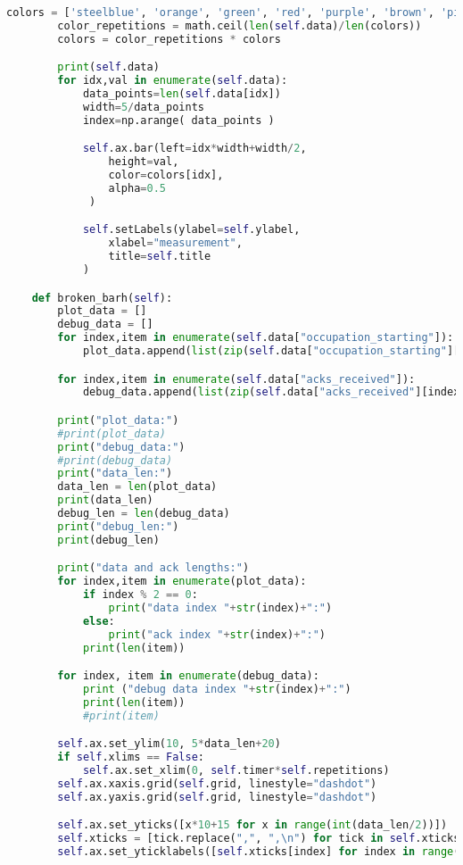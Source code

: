 \begin{lstlisting}[language=Python,caption=myplot.py]
        colors = ['steelblue', 'orange', 'green', 'red', 'purple', 'brown', 'pink']
        color_repetitions = math.ceil(len(self.data)/len(colors))
        colors = color_repetitions * colors

        print(self.data)
        for idx,val in enumerate(self.data):
            data_points=len(self.data[idx])
            width=5/data_points
            index=np.arange( data_points )

            self.ax.bar(left=idx*width+width/2,
                height=val,
                color=colors[idx],
                alpha=0.5
             )

            self.setLabels(ylabel=self.ylabel,
                xlabel="measurement",
                title=self.title
            )

    def broken_barh(self):
        plot_data = []
        debug_data = []
        for index,item in enumerate(self.data["occupation_starting"]):
            plot_data.append(list(zip(self.data["occupation_starting"][index], self.data["occupation_durations"][index])))

        for index,item in enumerate(self.data["acks_received"]):
            debug_data.append(list(zip(self.data["acks_received"][index], self.data["acks_received_bar_width"][index])))

        print("plot_data:")
        #print(plot_data)
        print("debug_data:")
        #print(debug_data)
        print("data_len:")
        data_len = len(plot_data)
        print(data_len)
        debug_len = len(debug_data)
        print("debug_len:")
        print(debug_len)

        print("data and ack lengths:")
        for index,item in enumerate(plot_data):
            if index % 2 == 0:
                print("data index "+str(index)+":")
            else:
                print("ack index "+str(index)+":")
            print(len(item))

        for index, item in enumerate(debug_data):
            print ("debug data index "+str(index)+":")
            print(len(item))
            #print(item)

        self.ax.set_ylim(10, 5*data_len+20)
        if self.xlims == False:
            self.ax.set_xlim(0, self.timer*self.repetitions)
        self.ax.xaxis.grid(self.grid, linestyle="dashdot")
        self.ax.yaxis.grid(self.grid, linestyle="dashdot")

        self.ax.set_yticks([x*10+15 for x in range(int(data_len/2))])
        self.xticks = [tick.replace(",", ",\n") for tick in self.xticks]
        self.ax.set_yticklabels([self.xticks[index] for index in range(int(data_len/2))])


\end{lstlisting}
